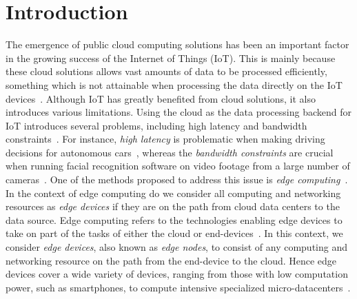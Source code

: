 \documentclass[article]{aaltoseries}
\newcommand{\todonotes}[2]{\todo[inline,color={#1}]{#2}}
\newcommand{\note}[1]{\todonotes{green!20!white}{#1}}
\newcommand{\warning}[1]{\todonotes{orange!20!white}{#1}}
\newcommand{\question}[1]{\todonotes{red!20!white}{#1}}
\newcommand{\blocking}[1]{\todonotes{red!40!white}{#1}}
\newcommand{\grammar}[1]{\todonotes{blue!20!white}{#1}}
\begin{document}




\section{Introduction} 
The emergence of public cloud computing solutions has been an important factor in the growing success of the Internet of Things (IoT). %
This is mainly because these cloud solutions allows vast amounts of data to be processed efficiently, something which is not attainable when processing the data directly on the IoT devices~\cite{shi_promise_2016}.
Although IoT has greatly benefited from cloud solutions, it also introduces various limitations.
Using the cloud as the data processing backend for IoT introduces several problems, including high latency and bandwidth constraints~\cite{shi_edge_2016}.
For instance, \emph{high latency} is problematic when making driving decisions for autonomous cars~\cite{shi_promise_2016}, whereas the \emph{bandwidth constraints} are crucial when running facial recognition software on video footage from a large number of cameras~\cite{taleb_multi-access_2017}.
One of the methods proposed to address this issue is \emph{edge computing}~\cite{shi_edge_2016}.
In the context of edge computing do we consider all computing and networking resources as \emph{edge devices} if they are on the path from cloud data centers to the data source.
Edge computing refers to the technologies enabling edge devices to take on part of the tasks of either the cloud or end-devices~\cite{shi_edge_2016}. 
In this context, we consider \emph{edge devices}, also known as \emph{edge nodes}, to consist of any computing and networking resource on the path from the end-device to the cloud.
Hence edge devices cover a wide variety of devices, ranging from those with low computation power, such as smartphones, to compute intensive specialized micro-datacenters~\cite{shi_promise_2016}.
\end{document}
